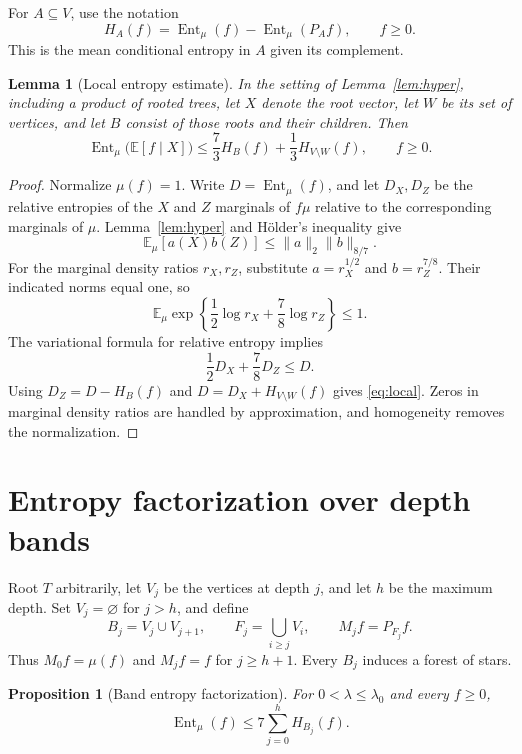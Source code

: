 \documentclass[11pt,reqno]{amsart}
\newtheorem{lemma}[theorem]{Lemma}
\newtheorem{proposition}[theorem]{Proposition}
\theoremstyle{remark}
\newcommand{\E}{\mathbb E}
\DeclareMathOperator{\Ent}{Ent}
\numberwithin{equation}{section}
\begin{document}
For $A\subseteq V$, use the notation
\[
 H_A(f)=\Ent_\mu(f)-\Ent_\mu(P_Af),\qquad f\ge0.
\]
This is the mean conditional entropy in $A$ given its complement.

\begin{lemma}[Local entropy estimate]\label{lem:local}
In the setting of Lemma~\ref{lem:hyper}, including a product of rooted trees, let $X$ denote the root vector, let $W$ be its set of vertices, and let $B$ consist of those roots and their children. Then
\begin{equation}\label{eq:local}
 \Ent_\mu\bigl(\E[f\mid X]\bigr)
 \le\frac73 H_B(f)+\frac13 H_{V\setminus W}(f),\qquad f\ge0.
\end{equation}
\end{lemma}

\begin{proof}
Normalize $\mu(f)=1$. Write $D=\Ent_\mu(f)$, and let $D_X,D_Z$ be the relative entropies of the $X$ and $Z$ marginals of $f\mu$ relative to the corresponding marginals of $\mu$. Lemma~\ref{lem:hyper} and H\"older's inequality give
\[
 \E_\mu[a(X)b(Z)]\le\|a\|_2\|b\|_{8/7}.
\]
For the marginal density ratios $r_X,r_Z$, substitute $a=r_X^{1/2}$ and $b=r_Z^{7/8}$. Their indicated norms equal one, so
\[
 \E_\mu\exp\left\{\frac12\log r_X+\frac78\log r_Z\right\}\le1.
\]
The variational formula for relative entropy implies
\[
 \frac12D_X+\frac78D_Z\le D.
\]
Using $D_Z=D-H_B(f)$ and $D=D_X+H_{V\setminus W}(f)$ gives \eqref{eq:local}. Zeros in marginal density ratios are handled by approximation, and homogeneity removes the normalization.
\end{proof}

\section{Entropy factorization over depth bands}

Root $T$ arbitrarily, let $V_j$ be the vertices at depth $j$, and let $h$ be the maximum depth. Set $V_j=\varnothing$ for $j>h$, and define
\[
 B_j=V_j\cup V_{j+1},\qquad F_j=\bigcup_{i\ge j}V_i,
 \qquad M_jf=P_{F_j}f.
\]
Thus $M_0f=\mu(f)$ and $M_jf=f$ for $j\ge h+1$. Every $B_j$ induces a forest of stars.

\begin{proposition}[Band entropy factorization]\label{prop:bands}
For $0<\lambda\le\lambda_0$ and every $f\ge0$,
\begin{equation}\label{eq:bands}
 \Ent_\mu(f)\le7\sum_{j=0}^h H_{B_j}(f).
\end{equation}
\end{proposition}
\end{document}
